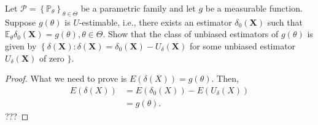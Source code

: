 \begin{exercise}
    Let \(\mathcal{P}=\left\{\mathbb{P}_{\theta}\right\}_{\theta \in \Theta}\) be a parametric family and let \(g\) be a measurable function. Suppose \(g(\theta)\) is \(U\)-estimable, i.e., there exists an estimator \(\delta_{0}(\mathbf{X})\) such that \(\mathbb{E}_{\theta} \delta_{0}(\mathbf{X})=g(\theta), \theta \in \Theta\). Show that the class of unbiased estimators of \(g(\theta)\) is given by
    \(\left\{\delta(\mathbf{X}): \delta(\mathbf{X})=\delta_{0}(\mathbf{X})-U_{\delta}(\mathbf{X})\right.\) for some unbiased estimator \(U_{\delta}(\mathbf{X})\) of zero \(\}\).
\end{exercise}

\begin{proof}
    What we need to prove is $E(\delta(X))=g(\theta)$. Then, 
    \[
        \begin{aligned}
            E(\delta(X))&=E(\delta_0(X))-E(U_\delta(X))\\
            &=g(\theta). 
        \end{aligned}
    \]
    ???
\end{proof}

